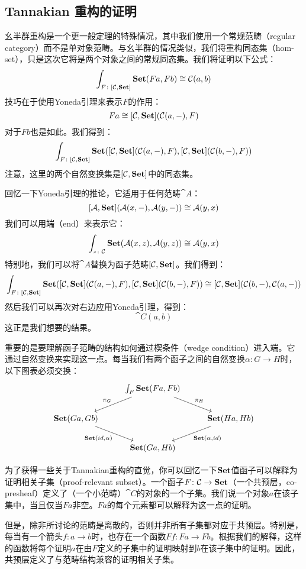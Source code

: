 \documentclass[DaoFP]{subfiles}
\begin{document}
\subsection{Tannakian 重构的证明}

幺半群重构是一个更一般定理的特殊情况，其中我们使用一个常规范畴（regular category）而不是单对象范畴。与幺半群的情况类似，我们将重构同态集（hom-set），只是这次它将是两个对象之间的常规同态集。我们将证明以下公式：
\[ \int_{F \colon [\mathcal{C}, \mathbf{Set}]} \mathbf{Set} (F a, F b) \cong \mathcal{C}(a, b) \]
技巧在于使用Yoneda引理来表示$F$的作用：
\[ F a \cong [\mathcal{C}, \mathbf{Set}] ( \mathcal{C} (a ,-), F) \]
对于$F b$也是如此。我们得到：
\[ \int_{F \colon [\mathcal{C}, \mathbf{Set}]} \mathbf{Set} ([\mathcal{C}, \mathbf{Set}] ( \mathcal{C} (a ,-), F), [\mathcal{C}, \mathbf{Set}] ( \mathcal{C} (b ,-), F)) \]
注意，这里的两个自然变换集是$[\mathcal{C}, \mathbf{Set}]$中的同态集。

回忆一下Yoneda引理的推论，它适用于任何范畴$\cat A$：
\[ [\mathcal{A}, \mathbf{Set}] (\mathcal{A} (x, -), \mathcal{A} (y, -)) \cong \mathcal{A} (y, x) \]
我们可以用端（end）来表示它：
\[ \int_{z \colon \mathcal{C}} \mathbf{Set} (\mathcal{A} (x, z), \mathcal{A} (y, z)) \cong \mathcal{A} (y, x) \]
特别地，我们可以将$\cat A$替换为函子范畴$[\mathcal{C}, \mathbf{Set}]$。我们得到：
\[ \int_{F \colon [\mathcal{C}, \mathbf{Set}]} \mathbf{Set} ([\mathcal{C}, \mathbf{Set}] ( \mathcal{C} (a ,-), F), [\mathcal{C}, \mathbf{Set}] ( \mathcal{C} (b ,-), F)) \cong [\mathcal{C}, \mathbf{Set}](\mathcal{C} (b ,-), \mathcal{C} (a ,-))\]
然后我们可以再次对右边应用Yoneda引理，得到：
\[ \cat C (a, b) \]
这正是我们想要的结果。

重要的是要理解函子范畴的结构如何通过楔条件（wedge condition）进入端。它通过自然变换来实现这一点。每当我们有两个函子之间的自然变换$\alpha \colon G \to H$时，以下图表必须交换：
\[
 \begin{tikzcd}
 & \int_F \Set (F a, F b)
 \arrow[dl, "\pi_G"']
 \arrow[dr, "\pi_H"]
 \\
 \Set(G a, G b)
 \arrow[dr, "{\Set(id, \alpha)}"'] && \Set (H a, H b)
  \arrow[dl, "{\Set (\alpha, id)}"]
\\
 & \Set (G a, H b)
 \end{tikzcd}
\]

为了获得一些关于Tannakian重构的直觉，你可以回忆一下$\mathbf{Set}$值函子可以解释为证明相关子集（proof-relevant subset）。一个函子$F \colon \mathcal{C} \to \mathbf{Set}$（一个共预层，co-presheaf）定义了（一个小范畴）$\cat C$的对象的一个子集。我们说一个对象$a$在该子集中，当且仅当$F a$非空。$F a$的每个元素都可以解释为这一点的证明。

但是，除非所讨论的范畴是离散的，否则并非所有子集都对应于共预层。特别是，每当有一个箭头$f \colon a \to b$时，也存在一个函数$F f \colon F a \to F b$。根据我们的解释，这样的函数将每个证明$a$在由$F$定义的子集中的证明映射到$b$在该子集中的证明。因此，共预层定义了与范畴结构兼容的证明相关子集。
\end{document}
